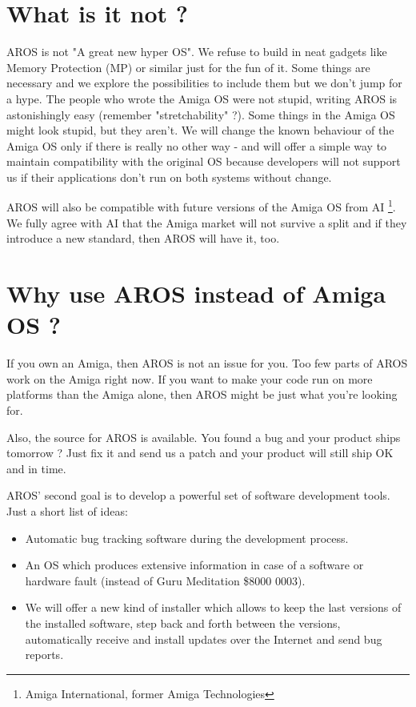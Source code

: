 \section{What is it not ?}

AROS is not "A great new hyper OS". We refuse to build in neat gadgets like
Memory Protection (MP) or similar just for the fun of it. Some things are
necessary and we explore the possibilities to include them but we don't
jump for a hype. The people who wrote the Amiga OS were not stupid, writing
AROS is astonishingly easy (remember "stretchability" ?). Some things in the
Amiga OS might look stupid, but they aren't. We will change the known
behaviour of the Amiga OS only if there is really no other way - and will
offer a simple way to maintain compatibility with the original OS because
developers will not support us if their applications don't run on both
systems without change.

AROS will also be compatible with future versions of the Amiga OS from AI
\footnote{Amiga International, former Amiga Technologies}.
We fully agree with AI that the Amiga market will not survive a split and
if they introduce a new standard, then AROS will have it, too.

\section{Why use AROS instead of Amiga OS ?}

If you own an Amiga, then AROS is not an issue for you. Too few parts of
AROS work on the Amiga right now. If you want to make your code run on more
platforms than the Amiga alone, then AROS might be just what you're looking
for.

Also, the source for AROS is available. You found a bug and your product
ships tomorrow ? Just fix it and send us a patch and your product will
still ship OK and in time.

AROS' second goal is to develop a powerful set of software development
tools. Just a short list of ideas:

\begin{itemize}
\item Automatic bug tracking software during the development process.

\item An OS which produces extensive information in case of a software or
hardware fault (instead of Guru Meditation \$8000 0003).

\item We will offer a new kind of installer which allows to keep the last
versions of the installed software, step back and forth between the
versions, automatically receive and install updates over the Internet and
send bug reports.

\end{itemize}

